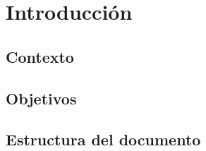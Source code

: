 \chapter{Introducción}


\section{Contexto}

\section{Objetivos}

\section{Estructura del documento}

